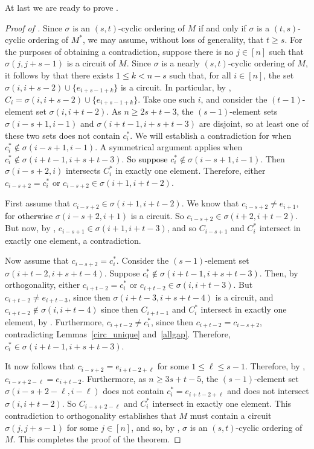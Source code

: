 \documentclass[11pt]{amsart}
\newcommand{\blue}{\textcolor{black}}
\newcommand{\bloo}{\textcolor{black}}
\begin{document}
At last we are ready to prove .

\begin{proof}[Proof of ]
Since $\sigma$ is an $(s, t)$-cyclic ordering of $M$ if and only if $\sigma$ is a $(t, s)$-cyclic ordering of $M^*$, we may assume, without loss of generality, that $t \geq s$. For the purposes of obtaining a contradiction, suppose there is no $j \in [n]$ such that $\sigma(j, j+s-1)$ is a circuit of $M$. Since $\sigma$ is a nearly $(s, t)$-cyclic ordering of $M$, it follows by  that there exists \blue{$1 \leq k < n-s$} such that, for all $i \in [n]$, the set $\sigma(i,i+s-2) \cup \{e_{i+s-1+k}\}$ is a circuit. In particular, by , $C_i=\sigma(i, i+s-2)\cup \{e_{i+s-1+k}\}$. Take one such $i$, and consider the $(t-1)$-element set $\sigma(i, i+t-2)$. As $n\ge 2s+t-3$, the $(s-1)$-element sets $\sigma(i-s+1, i-1)$ and $\sigma(i+t-1, i+s+t-3)$ are disjoint, so at least one of these two sets does not contain $c^*_i$.
We will establish a contradiction for when $c^*_i\not\in \sigma(i-s+1, i-1)$. A symmetrical argument applies when $c^*_i\not\in \sigma(i+t-1, i+s+t-3)$. \blue{So suppose} $c^*_i \notin \sigma(i-s+1,i-1)$. Then $\sigma(i-s+2, i)$ intersects $C^*_i$ in exactly one element. Therefore, either $c_{i-s+2}=c^*_i$ or $c_{i-s+2} \in \sigma(i+1, i+t-2)$.

First assume that $c_{i-s+2} \in \sigma(i+1, i+t-2)$. We know that $c_{i-s+2} \neq e_{i+1}$, \blue{for otherwise} $\sigma(i-s+2, i+1)$ is a circuit. So $c_{i-s+2} \in \sigma(i+2,i+t-2)$. But now, by , $c_{i-s+1} \in \sigma(i+1, i+t-3)$, and so $C_{i-s+1}$ and $C^*_i$ intersect in exactly one element, a contradiction.

Now assume that $c_{i-s+2} = c^*_i$. Consider the $(s-1)$-element set $\sigma\left(i+t-2, i+s+t-4\right)$. Suppose \bloo{$\left.c^*_i \notin \sigma(i+t-1, i+s+t-3)\right.$}. Then, by orthogonality, either $c_{i+t-2} = c^*_i$ or $c_{i+t-2} \in \sigma(i,i+t-3)$. But $c_{i+t-2} \neq e_{i+t-3}$, since then $\sigma(i+t-3, i+s+t-4)$ is a circuit, and $c_{i+t-2} \notin \sigma(i, i+t-4)$ since then $C_{i+t-1}$ and $C^*_i$ intersect in exactly one element, \blue{by }. Furthermore, $c_{i+t-2} \neq c^*_i$, since then $c_{i+t-2} = c_{i-s+2}$, contradicting Lemmas~\ref{circ_unique} and~\ref{allgap}. Therefore, $c^*_i \in \sigma(i+t-1, i+s+t-3)$.

It now follows that \bloo{$c_{i-s+2} = e_{i+t-2+\ell}$ for some $1 \leq \ell \leq s-1$}. Therefore, by , $c_{i-s+2-\ell} = e_{i+t-2}$. Furthermore, as $n \geq 3s+t-5$, the $(s-1)$-element set $\sigma(i-s+2-\ell, i-\ell)$ does not contain $c^*_i = e_{i+t-2+\ell}$ and does not intersect $\sigma(i, i+t-2)$. So $C_{i-s+2-\ell}$ and $C^*_i$ intersect in exactly one element. This contradiction to orthogonality establishes that $M$ must contain a circuit $\sigma(j, j+s-1)$ for some $j\in [n]$, and so, by , $\sigma$ is an $(s, t)$-cyclic ordering of $M$. This completes the proof of the theorem.
\end{proof}
\end{document}
